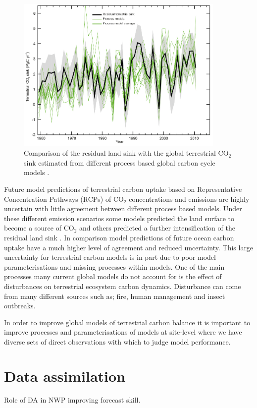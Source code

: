 \documentclass[11pt]{article}
\begin{document}
\begin{figure}[ht]
    \centering
    \includegraphics[width=0.9\textwidth]{ipcc_fig6_16.jpg}
    \caption{Comparison of the residual land sink with the global terrestrial CO\(_{2}\) sink estimated from different process based global carbon cycle models \citep{ciais2014carbon}.}
    \label{fig:ipcc_fig6.16}
\end{figure}

Future model predictions of terrestrial carbon uptake based on Representative Concentration Pathways (RCPs) \citep{moss2010next} of CO\(_{2}\) concentrations and emissions are highly uncertain with little agreement between different process based models. Under these different emission scenarios some models predicted the land surface to become a source of CO\(_{2}\) and others predicted a further intensification of the residual land sink \citep{jones2013twenty}. In comparison model predictions of future ocean carbon uptake have a much higher level of agreement and reduced uncertainty. This large uncertainty for terrestrial carbon models is in part due to poor model parameterisations and missing processes within models. One of the main processes many current global models do not account for is the effect of disturbances on terrestrial ecosystem carbon dynamics. Disturbance can come from many different sources such as; fire, human management and insect outbreaks.

In order to improve global models of terrestrial carbon balance it is important to improve processes and parameterisations of models at site-level where we have diverse sets of direct observations with which to judge model performance.         



\section{Data assimilation}

Role of DA in NWP improving forecast skill. 


{}
\end{document}
